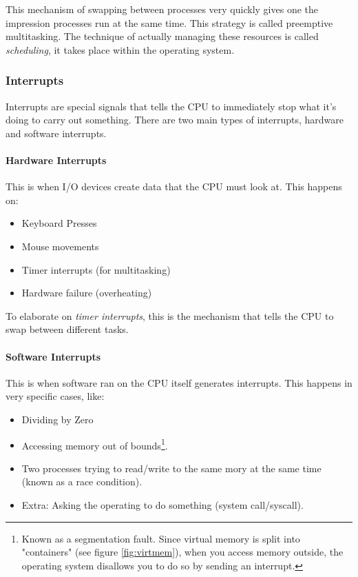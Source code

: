 \documentclass[../main.tex]{subfiles}
\begin{document}
This mechanism of swapping between processes very quickly gives one the impression processes run at the same time. This strategy is called preemptive multitasking. The technique of actually managing these resources is called \emph{scheduling}, it takes place within the operating system.

\subsubsection{Interrupts}
\label{4:sec:interrupts}

Interrupts are special signals that tells the CPU to immediately stop what it's doing to carry out something. There are two main types of interrupts, hardware and software interrupts.

\paragraph{Hardware Interrupts}

This is when I/O devices create data that the CPU must look at. This happens on:

\begin{itemize}
    \item Keyboard Presses
    \item Mouse movements
    \item Timer interrupts (for multitasking)
    \item Hardware failure (overheating)
\end{itemize}

To elaborate on \emph{timer interrupts}, this is the mechanism that tells the CPU to swap between different tasks.

\paragraph{Software Interrupts}

This is when software ran on the CPU itself generates interrupts. This happens in very specific cases, like:

\begin{itemize}
    \item Dividing by Zero
    \item Accessing memory out of bounds\footnote{Known as a segmentation fault. Since virtual memory is split into "containers" (see figure \ref{fig:virtmem}), when you access memory outside, the operating system disallows you to do so by sending an interrupt.}.
    \item Two processes trying to read/write to the same mory at the same time (known as a race condition).
    \item Extra: Asking the operating to do something (system call/syscall).
\end{itemize}
\end{document}
